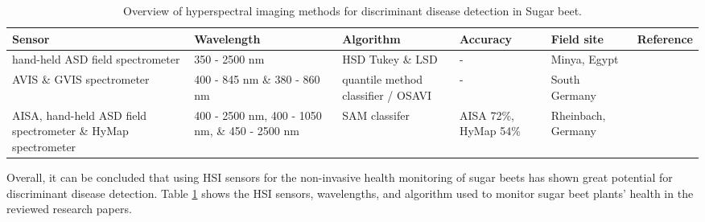 \begin{table}[h!]
\centering 
 \begin{tabular}{p{3cm}|p{2cm}|p{2.5cm}|p{2cm}|p{2cm}|p{2cm}} 
 

 \hline
  Sensor & Wavelength & Algorithm & Accuracy & Field site & Reference\\ [0.5ex] 
 \hline\hline
 hand-held ASD field spectrometer & 350 - 2500 nm & HSD Tukey \& LSD & - & Minya, Egypt& \cite{yones2019ajab} \\ 
 \hline
 AVIS \& GVIS spectrometer & 400 - 845 nm \& 380 - 860 nm & quantile method classifier / OSAVI & - &South Germany& \cite{laudien2005multitemporal} \\ 
 \hline
  AISA, hand-held ASD field spectrometer \& HyMap spectrometer & 400 - 2500 nm, 400 - 1050 nm, \& 450 - 2500 nm & SAM classifer & AISA 72\%, HyMap 54\% & Rheinbach, Germany & \cite{hillnhutter2011remote} \\ 
 \hline
 \end{tabular}
 \caption{ Overview of hyperspectral imaging methods for discriminant disease detection in Sugar beet.}
 \label{table:1}
\end{table}

\FloatBarrier

Overall, it can be concluded that using HSI sensors for the non-invasive health monitoring of sugar beets has shown great potential for discriminant disease detection. Table \ref{table:1} shows the HSI sensors, wavelengths, and algorithm used to monitor sugar beet plants’ health in the reviewed research papers.


